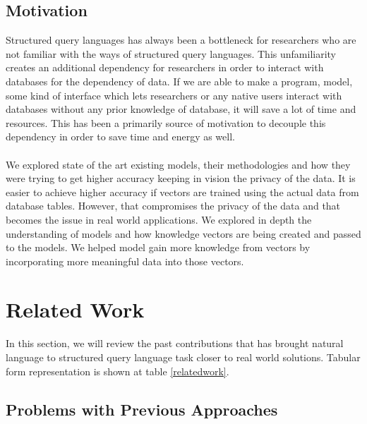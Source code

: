 \documentclass[12pt]{article}
\begin{document}
\subsection{Motivation}
Structured query languages has always been a bottleneck for researchers who are not familiar with the ways of structured query languages. This unfamiliarity creates an additional dependency for researchers in order to interact with databases for the dependency of data. If we are able to make a program, model, some kind of interface which lets researchers or any native users interact with databases without any prior knowledge of database, it will save a lot of time and resources. This has been a primarily source of motivation to decouple this dependency in order to save time and energy as well. 
\\
\\
We explored state of the art existing models, their methodologies and how they were trying to get higher accuracy keeping in vision the privacy of the data. It is easier to achieve higher accuracy if vectors are trained using the actual data from database tables. However, that compromises the privacy of the data and that becomes the issue in real world applications. We explored in depth the understanding of models and how knowledge vectors are being created and passed to the models. We helped model gain more knowledge from vectors by incorporating more meaningful data into those vectors. 




\newpage

\section{Related Work}

In this section, we will review the past contributions that has brought natural language to structured query language task closer to real world solutions. Tabular form representation is shown at table \ref{relatedwork}.

\subsection{Problems with Previous Approaches}
\end{document}
